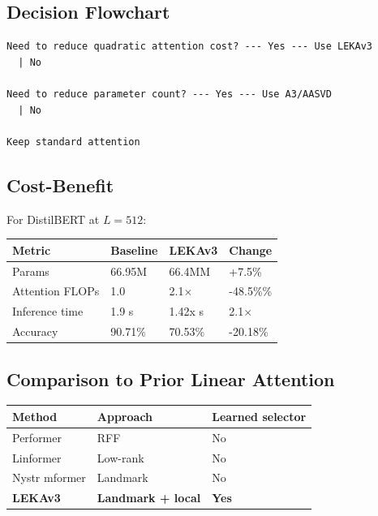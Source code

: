\subsection{Decision Flowchart}

\begin{lstlisting}
Need to reduce quadratic attention cost? --- Yes --- Use LEKAv3
  | No
   
Need to reduce parameter count? --- Yes --- Use A3/AASVD
  | No
   
Keep standard attention
\end{lstlisting}

\subsection{Cost-Benefit}

For DistilBERT at $L = 512$:

\begin{table}[H]
\centering
\small
\begin{tabular}{llll}
\toprule
\textbf{Metric} & \textbf{Baseline} & \textbf{LEKAv3} & \textbf{Change} \\
\midrule
Params & 66.95M & 66.4MM & +7.5\% \\
Attention FLOPs & 1.0 & 2.1$\times$ & -48.5\%\% \\
Inference time & 1.9 s & 1.42x s & 2.1$\times$ \\
Accuracy & 90.71\% & 70.53\% & -20.18\% \\
\bottomrule
\end{tabular}
\end{table}

\subsection{Comparison to Prior Linear Attention}

\begin{table}[H]
\centering
\small
\begin{tabular}{lll}
\toprule
\textbf{Method} & \textbf{Approach} & \textbf{Learned selector} \\
\midrule
Performer & RFF & No \\
Linformer & Low-rank & No \\
Nystr mformer & Landmark & No \\
\textbf{LEKAv3} & \textbf{Landmark + local} & \textbf{Yes} \\
\bottomrule
\end{tabular}
\end{table}


